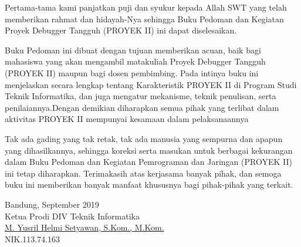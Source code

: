 \begin{acknowledgements}
Pertama-tama	 kami	 panjatkan	 puji	 dan	 syukur	 kepada	Allah	SWT	 yang	 telah	memberikan	rahmat	 dan	 hidayah-Nya	 sehingga	 Buku	 Pedoman	 dan	 Kegiatan	 Proyek	Debugger Tangguh (PROYEK	II)	ini	dapat	diselesaikan.

Buku	 Pedoman	 ini	 dibuat	 dengan	 tujuan	 memberikan	 acuan,	 baik	 bagi	 mahasiswa	 yang	
akan	mengambil	matakuliah	Proyek	Debugger Tangguh	(PROYEK	II)	maupun	bagi	dosen	pembimbing.	Pada	intinya	buku	ini	menjelaskan	secara	lengkap	tentang	Karakteristik	PROYEK	II	
di	 Program	 Studi	 Teknik	 Informatika,	 dan	 juga	 mengatur	 mekanisme,	 teknik	 penulisan,	 serta	
penilaiannya.Dengan	demikian	diharapkan	semua	pihak	yang	terlibat	dalam	aktivitas	PROYEK	II	
mempunyai	kesamaan	dalam	pelaksanaannya

Tak	 ada	 gading	 yang	 tak	 retak,	 tak	 ada	 manusia	 yang	 sempurna	 dan	 apapun	 yang	
dihasilkannya,	sehingga	koreksi	serta	masukan	untuk	berbagai	kekurangan	dalam	Buku	Pedoman	
dan	 Kegiatan	 Pemrograman	 dan	 Jaringan	 (PROYEK	 II)	 ini	 tetap	 diharapkan.	 Terimakasih	 atas	
kerjasama	 banyak	 pihak,	 dan	 semoga	 buku	 ini	 memberikan	 banyak	 manfaat	 khususnya	 bagi	
pihak-pihak	yang	terkait.


\begin{raggedright}

Bandung,  September 2019 \\
Ketua	Prodi	DIV	Teknik	Informatika\\[8ex]


\underline{M.	Yusril	Helmi	Setyawan,	S.Kom.,	M.Kom.}\\
NIK.113.74.163

\end{raggedright}

\end{acknowledgements}